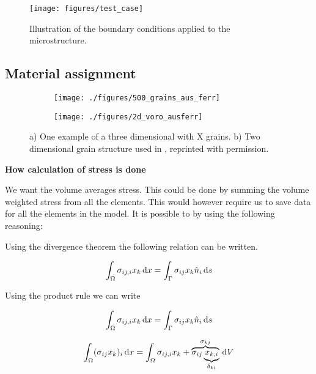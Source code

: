 \documentclass[crystal_plast.tex]{subfiles}
\begin{document}
\begin{figure}[ht]
\centering
\texttt{[image: figures/test\_case]}
\caption{Illustration of the boundary conditions applied to the microstructure.}
\label{fig:test_case}
\end{figure}

\subsection{Material assignment}



 \begin{figure}
\centering
\begin{subfigure}{.5\textwidth}
  \centering
  \texttt{[image: ./figures/500\_grains\_aus\_ferr]}
  \caption{}
  \label{fig:ausferr_3d}
\end{subfigure}%
\begin{subfigure}{.6\textwidth}
  \centering
  \texttt{[image: ./figures/2d\_voro\_ausferr]}
  \caption{}
  \label{fig:ausferr_2d}
\end{subfigure}
\caption{a) One example of a three dimensional  with X grains.  b) Two dimensional grain structure used in \cite{lillbacka2007multiscale}, reprinted with permission.}
\label{fig:ausferr}
\end{figure}


\textbf{How calculation of stress is done}

We want the volume averages stress. This could be done by summing the volume weighted stress from all the elements. This would however require us to save data for all the elements in the model. It is possible to by using the following reasoning:

Using the divergence theorem the following relation can be written.

\begin{equation}
\int_\Omega \sigma_{ij,i} x_k \, \mathrm{d} x = \int_\Gamma \sigma_{ij}  x_k \hat{n}_i \, \mathrm{d} s
\end{equation}

Using the product rule we can write

\begin{equation}
\int_\Omega \sigma_{ij,i} x_k \, \mathrm{d} x = \int_\Gamma \sigma_{ij}  x_k \hat{n}_i \, \mathrm{d} s
\end{equation}



\begin{equation}
\int_\Omega ( \sigma_{ij} x_k )_i \, \mathrm{d} x = \int_\Omega \sigma_{ij,i} x_k + \overbrace{\sigma_{ij} \underbrace{x_{k,i}}_{\delta_{ki}}}^{\sigma_{kj}} \, \mathrm{d} V 
\end{equation}
\end{document}

